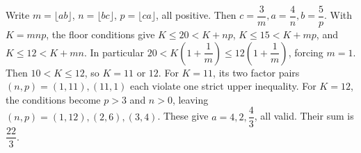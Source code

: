 Write $m=\lfloor ab\rfloor$, $n=\lfloor bc\rfloor$, $p=\lfloor ca\rfloor$, all positive. Then $c=\dfrac{3}{m},a=\dfrac{4}{n},b=\dfrac{5}{p}$. With $K=mnp$, the floor conditions give $K\le20<K+np$, $K\le15<K+mp$, and $K\le12<K+mn$. In particular $20<K(1+\dfrac{1}{m})\le12(1+\dfrac{1}{m})$, forcing $m=1$. Then $10<K\le12$, so $K=11$ or $12$. For $K=11$, its two factor pairs $(n,p)=(1,11),(11,1)$ each violate one strict upper inequality. For $K=12$, the conditions become $p>3$ and $n>0$, leaving $(n,p)=(1,12),(2,6),(3,4)$. These give $a=4,2,\dfrac{4}{3}$, all valid. Their sum is $\boxed{\dfrac{22}{3}}$.
